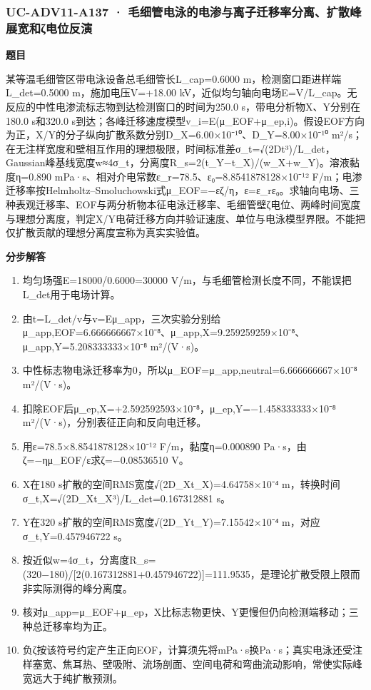 \documentclass[UTF8,11pt,a4paper]{ctexart}
\begin{document}
\subsubsection*{UC-ADV11-A137 · 毛细管电泳的电渗与离子迁移率分离、扩散峰展宽和ζ电位反演}
\noindent\textbf{题目}\par
某等温毛细管区带电泳设备总毛细管长L\_cap=0.6000 m，检测窗口距进样端L\_det=0.5000 m，施加电压V=+18.00 kV，近似均匀轴向电场E=V/L\_cap。无反应的中性电渗流标志物到达检测窗口的时间为250.0 s，带电分析物X、Y分别在180.0 s和320.0 s到达；各峰迁移速度模型v\_i=E(μ\_EOF+μ\_ep,i)。假设EOF方向为正，X/Y的分子纵向扩散系数分别D\_X=6.00×10⁻¹⁰、D\_Y=8.00×10⁻¹⁰ m²/s；在无注样宽度和壁相互作用的理想极限，时间标准差σ\_t=√(2Dt³)/L\_det，Gaussian峰基线宽度w≈4σ\_t，分离度R\_s=2(t\_Y−t\_X)/(w\_X+w\_Y)。溶液黏度η=0.890 mPa·s、相对介电常数ε\_r=78.5、ε₀=8.8541878128×10⁻¹² F/m；电渗迁移率按Helmholtz–Smoluchowski式μ\_EOF=−εζ/η，ε=ε\_rε₀。求轴向电场、三种表观迁移率、EOF与两分析物本征电泳迁移率、毛细管壁ζ电位、两峰时间宽度与理想分离度，判定X/Y电荷迁移方向并验证速度、单位与电泳模型界限。不能把仅扩散贡献的理想分离度宣称为真实实验值。\par
\medskip\noindent\textbf{分步解答}
\begin{enumerate}
\item 均匀场强E=18000/0.6000=30000 V/m，与毛细管检测长度不同，不能误把L\_det用于电场计算。
\item 由t=L\_det/v与v=Eμ\_app，三次实验分别给μ\_app,EOF=6.666666667×10⁻⁸、μ\_app,X=9.259259259×10⁻⁸、μ\_app,Y=5.208333333×10⁻⁸ m²/(V·s)。
\item 中性标志物电泳迁移率为0，所以μ\_EOF=μ\_app,neutral=6.666666667×10⁻⁸ m²/(V·s)。
\item 扣除EOF后μ\_ep,X=+2.592592593×10⁻⁸，μ\_ep,Y=−1.458333333×10⁻⁸ m²/(V·s)，分别表征正向和反向电迁移。
\item 用ε=78.5×8.8541878128×10⁻¹² F/m，黏度η=0.000890 Pa·s，由ζ=−ημ\_EOF/ε求ζ=−0.08536510 V。
\item X在180 s扩散的空间RMS宽度√(2D\_Xt\_X)=4.64758×10⁻⁴ m，转换时间σ\_t,X=√(2D\_Xt\_X³)/L\_det=0.167312881 s。
\item Y在320 s扩散的空间RMS宽度√(2D\_Yt\_Y)=7.15542×10⁻⁴ m，对应σ\_t,Y=0.457946722 s。
\item 按近似w=4σ\_t，分离度R\_s=(320−180)/[2(0.167312881+0.457946722)]=111.9535，是理论扩散受限上限而非实际测得的峰分离度。
\item 核对μ\_app=μ\_EOF+μ\_ep，X比标志物更快、Y更慢但仍向检测端移动；三种总迁移率均为正。
\item 负ζ按该符号约定产生正向EOF，计算须先将mPa·s换Pa·s；真实电泳还受注样塞宽、焦耳热、壁吸附、流场剖面、空间电荷和弯曲流动影响，常使实际峰宽远大于纯扩散预测。
\end{enumerate}
\end{document}
